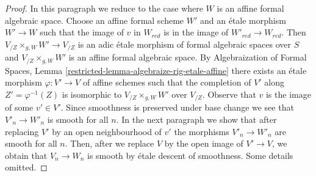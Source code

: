 \begin{proof}
\medskip\noindent
In this paragraph we reduce to the case where $W$ is an affine formal
algebraic space. Choose an affine formal scheme $W'$ and an \'etale morphism
$W' \to W$ such that the image of $v$ in $W_{red}$ is in the
image of $W'_{red} \to W_{red}$. Then $V_{/Z} \times_{g, W} W' \to V_{/Z}$
is an adic \'etale morphism of formal algebraic spaces over $S$
and $V_{/Z} \times_{g, W} W'$ is an affine formal algebraic space.
By Algebraization of Formal Spaces,
Lemma \ref{restricted-lemma-algebraize-rig-etale-affine}
there exists an \'etale morphism $\varphi : V' \to V$ of affine schemes
such that the completion of $V'$ along $Z' = \varphi^{-1}(Z)$
is isomorphic to $V_{/Z} \times_{g, W} W'$ over $V_{/Z}$.
Observe that $v$ is the image of some $v' \in V'$.
Since smoothness is preserved under base change we see that
$V'_n \to W'_n$ is smooth for all $n$. In the next paragraph
we show that after replacing $V'$ by an open neighbourhood of $v'$
the morphisms $V'_n \to W'_n$ are smooth for all $n$.
Then, after we replace $V$ by the open image of $V' \to V$,
we obtain that $V_n \to W_n$ is smooth by \'etale descent of smoothness.
Some details omitted.


\end{proof}
